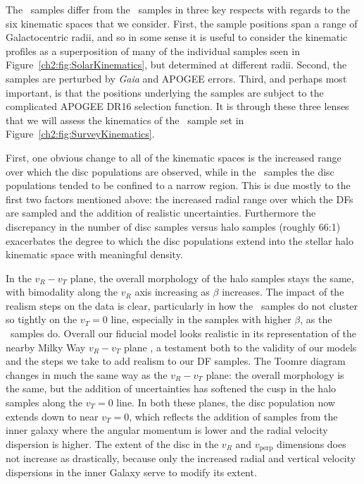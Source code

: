The \survey\ samples differ from the \solar\ samples in three key respects with regards to the six kinematic spaces that we consider. First, the sample positions span a range of Galactocentric radii, and so in some sense it is useful to consider the kinematic profiles as a superposition of many of the individual samples seen in Figure~\ref{ch2:fig:SolarKinematics}, but determined at different radii. Second, the samples are perturbed by \textit{Gaia} and APOGEE errors. Third, and perhaps most important, is that the positions underlying the samples are subject to the complicated APOGEE DR16 selection function. It is through these three lenses that we will assess the kinematics of the \survey\ sample set in Figure~\ref{ch2:fig:SurveyKinematics}.

First, one obvious change to all of the kinematic spaces is the increased range over which the disc populations are observed, while in the \solar\ samples the disc populations tended to be confined to a narrow region. This is due mostly to the first two factors mentioned above: the increased radial range over which the DFs are sampled and the addition of realistic uncertainties. Furthermore the discrepancy in the number of disc samples versus halo samples (roughly 66:1) exacerbates the degree to which the disc populations extend into the stellar halo kinematic space with meaningful density.

In the $v_{R}-v_{T}$ plane, the overall morphology of the halo samples stays the same, with bimodality along the $v_{R}$ axis increasing as $\beta$ increases. The impact of the realism steps on the data is clear, particularly in how the \survey\ samples do not cluster so tightly on the $v_{T}=0$ line, especially in the samples with higher $\beta$, as the \solar\ samples do. Overall our fiducial model looks realistic in its representation of the nearby Milky Way $v_{R}-v_{T}$ plane \parencite[c.f. figures 2 and 1 in ][ respectively, although note they use spherical coordinates]{belokurov18,fattahi19}, a testament both to the validity of our models and the steps we take to add realism to our DF samples. The Toomre diagram changes in much the same way as the $v_{R}-v_{T}$ plane: the overall morphology is the same, but the addition of uncertainties has softened the cusp in the halo samples along the $v_{T}=0$ line. In both these planes, the disc population now extends down to near $v_{T}=0$, which reflects the addition of samples from the inner galaxy where the angular momentum is lower and the radial velocity dispersion is higher. The extent of the disc in the $v_{R}$ and $v_\mathrm{perp}$ dimensions does not increase as drastically, because only the increased radial and vertical velocity dispersions in the inner Galaxy serve to modify its extent.

